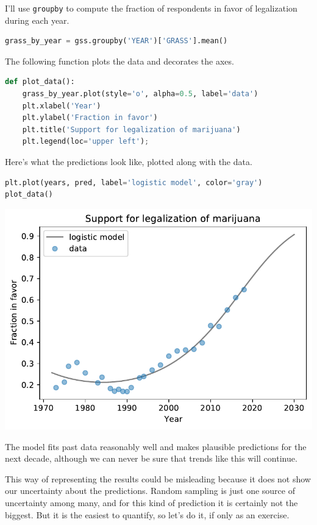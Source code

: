 I'll use \passthrough{\lstinline!groupby!} to compute the fraction of
respondents in favor of legalization during each year.

\begin{lstlisting}[language=Python]
grass_by_year = gss.groupby('YEAR')['GRASS'].mean()
\end{lstlisting}

The following function plots the data and decorates the axes.

\begin{lstlisting}[language=Python]
def plot_data():
    grass_by_year.plot(style='o', alpha=0.5, label='data')
    plt.xlabel('Year')
    plt.ylabel('Fraction in favor')
    plt.title('Support for legalization of marijuana')
    plt.legend(loc='upper left');
\end{lstlisting}

Here's what the predictions look like, plotted along with the data.

\begin{lstlisting}[language=Python]
plt.plot(years, pred, label='logistic model', color='gray')
plot_data()
\end{lstlisting}

\begin{center}
\includegraphics[scale=0.75]{chapters/12_bootstrap_files/12_bootstrap_144_0.pdf}
\end{center}

The model fits past data reasonably well and makes plausible predictions
for the next decade, although we can never be sure that trends like this
will continue.

This way of representing the results could be misleading because it does
not show our uncertainty about the predictions. Random sampling is just
one source of uncertainty among many, and for this kind of prediction it
is certainly not the biggest. But it is the easiest to quantify, so
let's do it, if only as an exercise.

